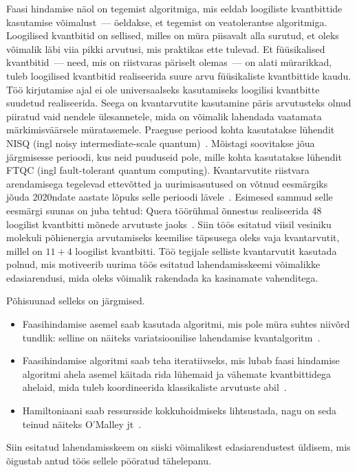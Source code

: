\documentclass[12pt]{report}
\begin{document}
Faasi hindamise näol on tegemist algoritmiga, mis eeldab loogiliste kvantbittide kasutamise võimalust~--- öeldakse, et tegemist on veatolerantse algoritmiga.
Loogilised kvantbitid on sellised, milles on müra piisavalt alla surutud, et oleks võimalik läbi viia pikki arvutusi, mis praktikas ette tulevad.
Et füüsikalised kvantbitid~--- need, mis on riistvaras päriselt olemas~--- on alati mürarikkad, tuleb loogilised kvantbitid realiseerida suure arvu füüsikaliste kvantbittide kaudu.
Töö kirjutamise ajal ei ole universaalseks kasutamiseks loogilisi kvantbitte suudetud realiseerida.
Seega on kvantarvutite kasutamine päris arvutusteks olnud piiratud vaid nendele ülesannetele, mida on võimalik lahendada vaatamata märkimisväärsele müratasemele.
Praeguse periood kohta kasutatakse lühendit NISQ (ingl noisy intermediate-scale quantum)~\cite{preskill}.
Mõistagi soovitakse jõua järgmisesse perioodi, kus neid puuduseid pole, mille kohta kasutatakse lühendit FTQC (ingl fault-tolerant quantum computing).
Kvantarvutite riistvara arendamisega tegelevad ettevõtted ja uurimisasutused on võtnud eesmärgiks jõuda 2020ndate aastate lõpuks selle perioodi lävele~\cite{ibmq+roadmap, quera+roadmap}.
Esimesed sammud selle eesmärgi suunas on juba tehtud: Quera töörühmal õnnestus realiseerida 48 loogilist kvantbitti mõnede arvutuste jaoks~\cite{quera}.
Siin töös esitatud viisil vesiniku molekuli põhienergia arvutamiseks keemilise täpsusega oleks vaja kvantarvutit, millel on \(11 + 4\) loogilist kvantbitti.
Töö tegijale selliste kvantarvutit kasutada polnud, mis motiveerib uurima töös esitatud lahendamisskeemi võimalikke edasiarendusi, mida oleks võimalik rakendada ka kasinamate vahenditega.

Põhisuunad selleks on järgmised.
\begin{itemize}
  \item Faasihindamise asemel saab kasutada algoritmi, mis pole müra suhtes niivõrd tundlik: selline on näiteks variatsioonilise lahendamise kvantalgoritm~\cite{omalley+etal, raidlo}.
  \item Faasihindamise algoritmi saab teha iteratiivseks, mis lubab faasi hindamise algoritmi ahela asemel käitada rida lühemaid ja vähemate kvantbittidega ahelaid, mida tuleb koordineerida klassikaliste arvutuste abil~\cite{whitfield+etal2011, omalley+etal}.
  \item Hamiltoniaani saab ressursside kokkuhoidmiseks lihtsustada, nagu on seda teinud näiteks O'Malley jt~\cite{omalley+etal}.
\end{itemize}
Siin esitatud lahendamisskeem on siiski võimalikest edasiarendustest üldisem, mis õigustab antud töös sellele pööratud tähelepanu.
\end{document}
